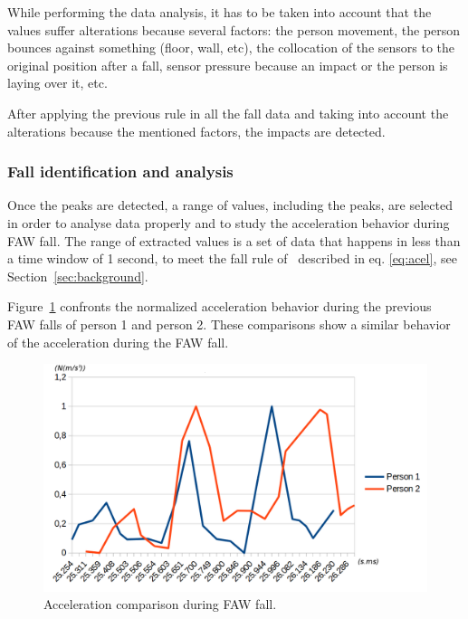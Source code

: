 \documentclass[10pt,journal,compsoc]{IEEEtran}
\begin{document}
While performing the data analysis, it has to be taken into account that the values suffer 
alterations because several factors: the person movement, the person bounces against something 
(floor, wall, etc), the collocation of the sensors to the original position after a fall, 
sensor pressure because an impact or the person is laying over it, etc.

After applying the previous rule in all the fall data and taking into account the alterations 
because the mentioned factors, the impacts are detected.

\subsubsection{Fall identification and analysis} Once the peaks are detected, a range of values, 
including the peaks, are selected in order to analyse data properly and to study the acceleration 
behavior during FAW fall. The range of extracted values is a set of data that happens in less 
than a time window of 1 second, to meet the fall rule of~\cite{Luder2009} described in eq. \ref{eq:acel}, see Section~\ref{sec:background}. 

%		

Figure~\ref{fig:FAWcomparison} confronts the normalized acceleration behavior during the previous FAW falls of person 1 and person 2. These comparisons show a similar behavior of the acceleration during the FAW fall.
\begin{figure}[!ht]
	\centering
	\includegraphics[scale=0.2]{Images/TwoFallsComparative.png}
	\caption[Acceleration during FAW fall]{Acceleration comparison during FAW fall.}
	\label{fig:FAWcomparison}
\end{figure}
\end{document}
